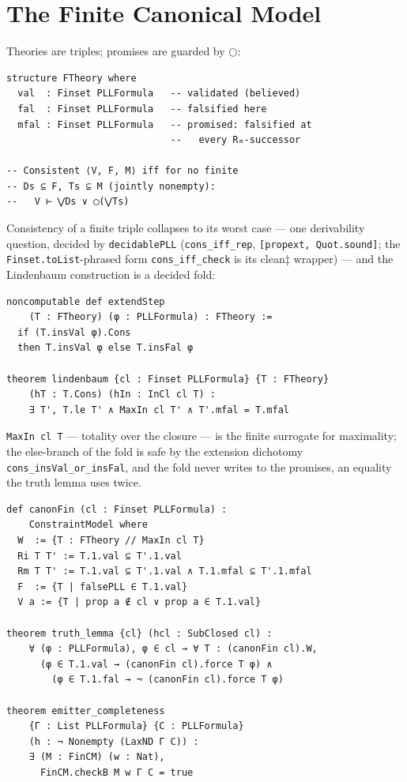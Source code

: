 \section{The Finite Canonical Model}\label{app:canonical}

Theories are triples; promises are guarded by \ensuremath{\bigcirc}:

\begin{lstlisting}
structure FTheory where
  val  : Finset PLLFormula   -- validated (believed)
  fal  : Finset PLLFormula   -- falsified here
  mfal : Finset PLLFormula   -- promised: falsified at
                             --   every Rₘ-successor

-- Consistent ⟨V, F, M⟩ iff for no finite
-- Ds ⊆ F, Ts ⊆ M (jointly nonempty):
--   V ⊢ ⋁Ds ∨ ◯(⋁Ts)
\end{lstlisting}

Consistency of a finite triple collapses to its worst case — one
derivability question, decided by \texttt{decidablePLL}
(\texttt{cons\_iff\_rep}, \texttt{[propext, Quot.sound]}; the
\texttt{Finset.toList}-phrased form \texttt{cons\_iff\_check} is its
clean‡ wrapper) — and the Lindenbaum construction is a decided fold:

\begin{lstlisting}
noncomputable def extendStep
    (T : FTheory) (φ : PLLFormula) : FTheory :=
  if (T.insVal φ).Cons
  then T.insVal φ else T.insFal φ

theorem lindenbaum {cl : Finset PLLFormula} {T : FTheory}
    (hT : T.Cons) (hIn : InCl cl T) :
    ∃ T', T.le T' ∧ MaxIn cl T' ∧ T'.mfal = T.mfal
\end{lstlisting}

\noindent \texttt{MaxIn cl T} — totality over the closure — is the
finite surrogate for maximality; the else-branch of the fold is safe by
the extension dichotomy \texttt{cons\_insVal\_or\_insFal}, and the fold
never writes to the promises, an equality the truth lemma uses twice.

\begin{lstlisting}
def canonFin (cl : Finset PLLFormula) :
    ConstraintModel where
  W  := {T : FTheory // MaxIn cl T}
  Ri T T' := T.1.val ⊆ T'.1.val
  Rm T T' := T.1.val ⊆ T'.1.val ∧ T.1.mfal ⊆ T'.1.mfal
  F  := {T | falsePLL ∈ T.1.val}
  V a := {T | prop a ∉ cl ∨ prop a ∈ T.1.val}

theorem truth_lemma {cl} (hcl : SubClosed cl) :
    ∀ (φ : PLLFormula), φ ∈ cl → ∀ T : (canonFin cl).W,
      (φ ∈ T.1.val → (canonFin cl).force T φ) ∧
        (φ ∈ T.1.fal → ¬ (canonFin cl).force T φ)

theorem emitter_completeness
    {Γ : List PLLFormula} {C : PLLFormula}
    (h : ¬ Nonempty (LaxND Γ C)) :
    ∃ (M : FinCM) (w : Nat),
      FinCM.checkB M w Γ C = true
\end{lstlisting}

